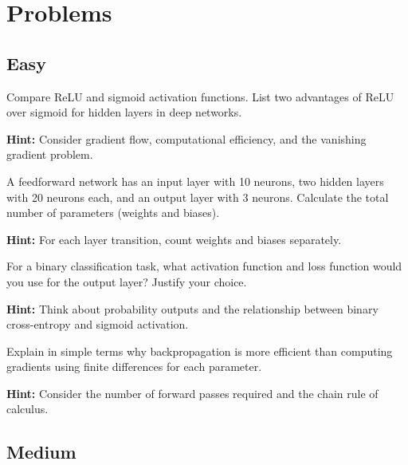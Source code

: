 
\section*{Problems}

\subsection*{Easy}

\begin{problem}
Compare ReLU and sigmoid activation functions. List two advantages of ReLU over sigmoid for hidden layers in deep networks.

\textbf{Hint:} Consider gradient flow, computational efficiency, and the vanishing gradient problem.
\end{problem}

\begin{problem}
A feedforward network has an input layer with 10 neurons, two hidden layers with 20 neurons each, and an output layer with 3 neurons. Calculate the total number of parameters (weights and biases).

\textbf{Hint:} For each layer transition, count weights and biases separately.
\end{problem}

\begin{problem}
For a binary classification task, what activation function and loss function would you use for the output layer? Justify your choice.

\textbf{Hint:} Think about probability outputs and the relationship between binary cross-entropy and sigmoid activation.
\end{problem}

\begin{problem}
Explain in simple terms why backpropagation is more efficient than computing gradients using finite differences for each parameter.

\textbf{Hint:} Consider the number of forward passes required and the chain rule of calculus.
\end{problem}

\subsection*{Medium}

